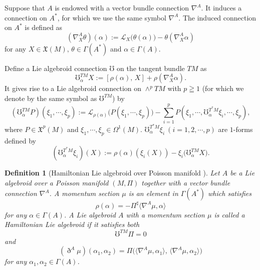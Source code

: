 \documentclass[a4paper,11pt,dvipdfmx]{article}
\newtheorem{dfn}[thm]{Definition}
\numberwithin{equation}{section}
\begin{document}
Suppose that $A$ is endowed with a vector bundle connection $\nabla^A$. It induces a connection on $A^*$, for which we use the same symbol $\nabla^A$. 
The induced connection on $A^*$ is defined as 
\begin{equation}\label{sec2:eqn_conn1}
(\nabla^A_X \theta)(\alpha) :=\mathcal{L}_X\bigl(\theta(\alpha)\bigr) - \theta(\nabla^A_X\alpha) 
\end{equation}
for any $X\in \mathfrak{X}(M),\,\theta\in\varGamma(A^*)$ and $\alpha\in\varGamma(A)$. 

Define a Lie algebroid connection $\mho$ on the tangent bundle $TM$ as 
\begin{equation}\label{sec2:eqn_conn2}
\mho_{\alpha}^{TM}X := [\rho(\alpha),\,X] + \rho(\nabla^A_X\alpha). 
\end{equation}
It gives rise to a Lie algebroid connection on $\wedge^pTM$ with $p\geqq 1$ (for which we denote by the same symbol as $\mho^{TM}$) by 
\begin{equation}
(\mho_{\alpha}^{TM}P)(\xi_1,\cdots,\xi_p):= \mathcal{L}_{\rho(\alpha)}\bigl(P(\xi_1,\cdots, \xi_p)\bigr) 
  - \sum_{i=1}^pP(\xi_1,\cdots,\mho^{T^*M}_{\alpha}\xi_i,\cdots,\xi_p), 
\end{equation}
where $P\in \mathfrak{X}^p(M)$ and $\xi_1,\cdots,\xi_p\in \Omega^1(M)$.
$\mho^{T^*M}_{\alpha}\xi_i~(i=1,2,\cdots, p)$ are $1$-forms defined by 
\[
 (\mho^{T^*M}_{\alpha}\xi_i)(X) := \rho(\alpha)(\xi_i(X)) - \xi_i\bigl(\mho^{TM}_{\alpha}X\bigr). 
\]

\begin{dfn}[Hamiltonian Lie algebroid over Poisson manifold \cite{BRWham23}]\label{sec2:dfn_ham Lie alg}
Let $A$ be a Lie algebroid over a Poisson manifold $(M,\Pi)$ together with a vector bundle connection $\nabla^A$. 
A momentum section $\mu$ is an element in $\varGamma(A^*)$ which satisfies 
\begin{equation}\label{sec2:dfn_ham Lie alg1}
 \rho(\alpha) = -\Pi^{\sharp}\langle \nabla^A\mu, \alpha\rangle
\end{equation}
for any $\alpha\in\varGamma(A)$. A Lie algebroid $A$ with a momentum section $\mu$ is called a Hamiltonian Lie algebroid if it satisfies both 
\begin{equation}\label{sec2:dfn_ham Lie alg2}
\mho^{TM}\Pi = 0
\end{equation}
and 
\begin{equation}\label{sec2:dfn_ham Lie alg3}
(\eth^A\mu)(\alpha_1,\alpha_2) = \Pi\bigl(\langle \nabla^A\mu, \alpha_1\rangle,\, \langle \nabla^A\mu, \alpha_2\rangle\bigr) 
\end{equation}
for any $\alpha_1,\alpha_2\in\varGamma(A)$. 
\end{dfn}
\bigskip 
\end{document}
